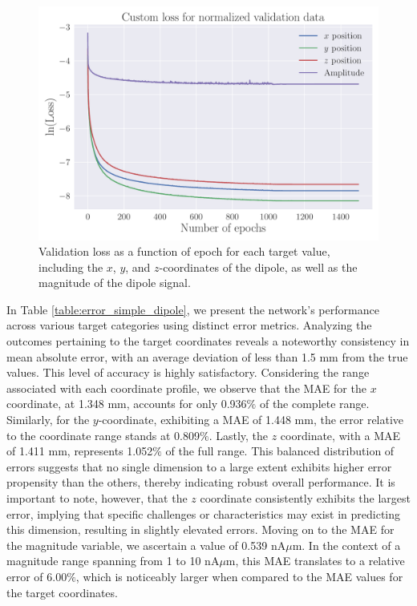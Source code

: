 \documentclass[a4paper, UKenglish, 11pt]{uiomaster}
\begin{document}
\begin{figure}[!htb]
    \centering
    \includegraphics[width=\linewidth]{figures/NN_magnitude/Custom_Loss_mse_targets_amplitudes_test_custom_loss_tanh_32_0.001_0.35_0.1_0_1500_(0).pdf}
    \caption{Validation loss as a function of epoch for each target value, including the $x$, $y$, and $z$-coordinates of the dipole, as well as the magnitude of the dipole signal.}
    \label{fig:dipole_w_amplitude_targets}
\end{figure}


In Table \ref{table:error_simple_dipole}, we present the network's performance across various target categories using distinct error metrics. Analyzing the outcomes pertaining to the target coordinates reveals a noteworthy consistency in mean absolute error, with an average deviation of less than 1.5 mm from the true values. This level of accuracy is highly satisfactory. Considering the range associated with each coordinate profile, we observe that the MAE for the $x$ coordinate, at 1.348 mm, accounts for only 0.936$\%$ of the complete range. Similarly, for the $y$-coordinate, exhibiting a MAE of 1.448 mm, the error relative to the coordinate range stands at 0.809$\%$. Lastly, the $z$ coordinate, with a MAE of 1.411 mm, represents 1.052$\%$ of the full range. This balanced distribution of errors suggests that no single dimension to a large extent exhibits higher error propensity than the others, thereby indicating robust overall performance. It is important to note, however, that the $z$ coordinate consistently exhibits the largest error, implying that specific challenges or characteristics may exist in predicting this dimension, resulting in slightly elevated errors. Moving on to the MAE for the magnitude variable, we ascertain a value of 0.539 nA$\mu$m. In the context of a magnitude range spanning from 1 to 10 nA$\mu$m, this MAE translates to a relative error of 6.00$\%$, which is noticeably larger when compared to the MAE values for the target coordinates.
\end{document}
